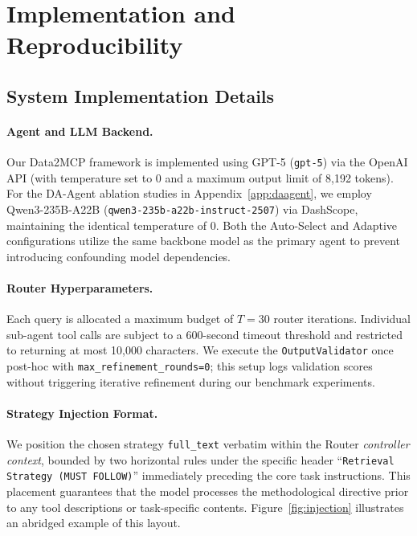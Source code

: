 \appendix

\section{Implementation and Reproducibility}
\label{app:implementation}

\subsection{System Implementation Details}
\label{app:impl}

\paragraph{Agent and LLM Backend.}
Our Data2MCP framework is implemented using GPT-5 (\texttt{gpt-5}) via the OpenAI API (with temperature set to $0$ and a maximum output limit of 8,192 tokens). For the DA-Agent ablation studies in Appendix~\ref{app:daagent}, we employ Qwen3-235B-A22B (\texttt{qwen3-235b-a22b-instruct-2507}) via DashScope, maintaining the identical temperature of $0$. Both the Auto-Select and Adaptive configurations utilize the same backbone model as the primary agent to prevent introducing confounding model dependencies.

\paragraph{Router Hyperparameters.}
Each query is allocated a maximum budget of $T=30$ router iterations. Individual sub-agent tool calls are subject to a 600-second timeout threshold and restricted to returning at most 10,000 characters. We execute the \texttt{OutputValidator} once post-hoc with \texttt{max\_refinement\_rounds=0}; this setup logs validation scores without triggering iterative refinement during our benchmark experiments.

\paragraph{Strategy Injection Format.}
We position the chosen strategy \texttt{full\_text} verbatim within the Router \emph{controller context}, bounded by two horizontal rules under the specific header ``\texttt{Retrieval Strategy (MUST FOLLOW)}'' immediately preceding the core task instructions. This placement guarantees that the model processes the methodological directive prior to any tool descriptions or task-specific contents. Figure~\ref{fig:injection} illustrates an abridged example of this layout.

